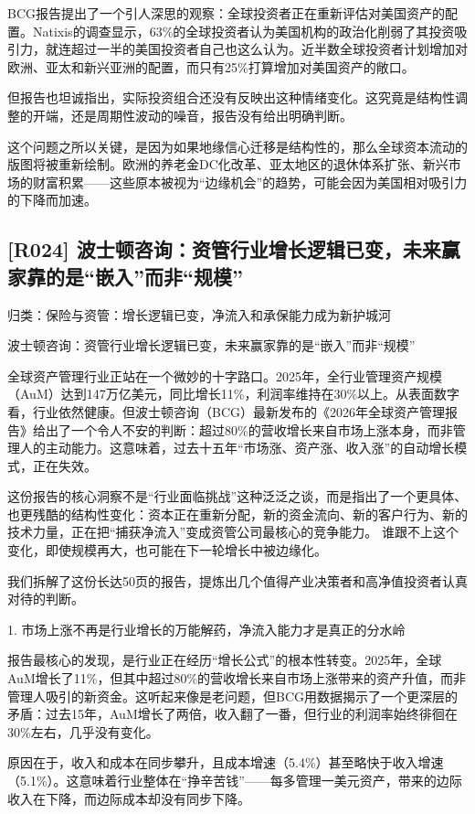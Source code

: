 \documentclass[11pt]{ctexart}
\begin{document}
BCG报告提出了一个引人深思的观察：全球投资者正在重新评估对美国资产的配置。Natixis的调查显示，63\%的全球投资者认为美国机构的政治化削弱了其投资吸引力，就连超过一半的美国投资者自己也这么认为。近半数全球投资者计划增加对欧洲、亚太和新兴亚洲的配置，而只有25\%打算增加对美国资产的敞口。

但报告也坦诚指出，实际投资组合还没有反映出这种情绪变化。这究竟是结构性调整的开端，还是周期性波动的噪音，报告没有给出明确判断。

这个问题之所以关键，是因为如果地缘信心迁移是结构性的，那么全球资本流动的版图将被重新绘制。欧洲的养老金DC化改革、亚太地区的退休体系扩张、新兴市场的财富积累——这些原本被视为“边缘机会”的趋势，可能会因为美国相对吸引力的下降而加速。

\subsection{[R024] 波士顿咨询：资管行业增长逻辑已变，未来赢家靠的是“嵌入”而非“规模”}
{\small\color{refgray}归类：保险与资管：增长逻辑已变，净流入和承保能力成为新护城河}

波士顿咨询：资管行业增长逻辑已变，未来赢家靠的是“嵌入”而非“规模”

全球资产管理行业正站在一个微妙的十字路口。2025年，全行业管理资产规模（AuM）达到147万亿美元，同比增长11\%，利润率维持在30\%以上。从表面数字看，行业依然健康。但波士顿咨询（BCG）最新发布的《2026年全球资产管理报告》给出了一个令人不安的判断：超过80\%的营收增长来自市场上涨本身，而非管理人的主动能力。这意味着，过去十五年“市场涨、资产涨、收入涨”的自动增长模式，正在失效。

这份报告的核心洞察不是“行业面临挑战”这种泛泛之谈，而是指出了一个更具体、也更残酷的结构性变化：资本正在重新分配，新的资金流向、新的客户行为、新的技术力量，正在把“捕获净流入”变成资管公司最核心的竞争能力。 谁跟不上这个变化，即使规模再大，也可能在下一轮增长中被边缘化。

我们拆解了这份长达50页的报告，提炼出几个值得产业决策者和高净值投资者认真对待的判断。

1. 市场上涨不再是行业增长的万能解药，净流入能力才是真正的分水岭

报告最核心的发现，是行业正在经历“增长公式”的根本性转变。2025年，全球AuM增长了11\%，但其中超过80\%的营收增长来自市场上涨带来的资产升值，而非管理人吸引的新资金。这听起来像是老问题，但BCG用数据揭示了一个更深层的矛盾：过去15年，AuM增长了两倍，收入翻了一番，但行业的利润率始终徘徊在30\%左右，几乎没有变化。

原因在于，收入和成本在同步攀升，且成本增速（5.4\%）甚至略快于收入增速（5.1\%）。这意味着行业整体在“挣辛苦钱”——每多管理一美元资产，带来的边际收入在下降，而边际成本却没有同步下降。
\end{document}
